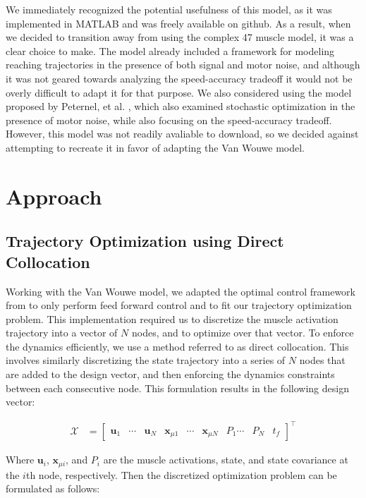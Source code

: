 \documentclass[letterpaper, 10pt, conference]{ieeeconf}
\begin{document}
We immediately recognized the potential usefulness of this model, as it was implemented in MATLAB and was freely available on github. As a result, when we decided to transition away from using the complex 47 muscle model, it was a clear choice to make. The model already included a framework for modeling reaching trajectories in the presence of both signal and motor noise, and although it was not geared towards analyzing the speed-accuracy tradeoff it would not be overly difficult to adapt it for that purpose. We also considered using the model proposed by Peternel, et al. \cite{c9}, which also examined stochastic optimization in the presence of motor noise, while also focusing on the speed-accuracy tradeoff. However, this model was not readily avaliable to download, so we decided against attempting to recreate it in favor of adapting the Van Wouwe model.

\section{Approach}

\subsection{Trajectory Optimization using Direct Collocation}
Working with the Van Wouwe model, we adapted the optimal control framework from \cite{c7} to only perform feed forward control and to fit our trajectory optimization problem. This implementation required us to discretize the muscle activation trajectory into a vector of $N$ nodes, and to optimize over that vector. To enforce the dynamics efficiently, we use a method referred to as direct collocation. This involves similarly discretizing the state trajectory into a series of $N$ nodes that are added to the design vector, and then enforcing the dynamics constraints between each consecutive node. This formulation results in the following design vector:

\begin{align}
    \mathcal{X} &= \begin{bmatrix}
        \mathbf{u}_1 & \cdots & \mathbf{u}_N & \mathbf{x}_{\mu1} & \cdots & \mathbf{x}_{\mu N} & P_1 \cdots & P_N & t_f
    \end{bmatrix}^\top
\end{align}

Where $\mathbf{u}_i$, $\mathbf{x}_{\mu i}$, and $P_i$ are the muscle activations, state, and state covariance at the $i$th node, respectively. Then the discretized optimization problem can be formulated as follows:
\end{document}
